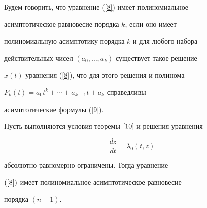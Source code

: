 \begin{defn}\label{D_4}


Будем говорить, что уравнение (\ref{8}) имеет полиномиальное


асимптотическое равновесие порядка $k$, если оно имеет


полиномиальную асимптотику порядка $k$ и для любого набора


действительных чисел $(a_{0},\dotsc,a_{k})$ существует такое решение


$x(t)$ уравнения (\ref{8}), что для этого решения и полинома


$P_{k}(t)=a_{0}t^k + \dotsb +a_{k-1}t+a_{k}$ справедливы


асимптотические формулы (\ref{9}).


\end{defn}





\begin{thm}\label{T_11}


Пусть выполняются условия теоремы $\ref{10}$ и решения уравнения


\begin{equation}


\label{16}


\frac{dz}{dt}=\lambda_{0}(t,z)


\end{equation}


абсолютно равномерно ограничены. Тогда уравнение


$(\ref{8})$ имеет полиномиальное асимптотическое равновесие


порядка $(n-1)$.


\end{thm}





